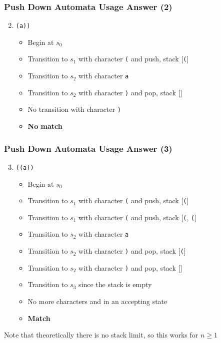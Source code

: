 \documentclass[aspectratio=169]{beamer}
\begin{document}
\begin{frame}
\frametitle{Push Down Automata Usage Answer (2)}

\pda{}

\begin{enumerate}
  \setcounter{enumi}{1}
  \item \lstinline{(a))}
    \begin{itemize}
      \item Begin at $s_0$
      \item Transition to $s_1$ with character \lstinline{(} and push, stack
        [\lstinline{(}]
      \item Transition to $s_2$ with character \lstinline{a}
      \item Transition to $s_2$ with character \lstinline{)} and pop, stack []
      \item No transition with character \lstinline{)}
      \item \textbf{No match}
    \end{itemize}
\end{enumerate}
\end{frame}

\begin{frame}
\frametitle{Push Down Automata Usage Answer (3)}

\pda{}

\begin{enumerate}
  \setcounter{enumi}{2}
  \item \lstinline{((a))}
    \begin{itemize}
      \item Begin at $s_0$
      \item Transition to $s_1$ with character \lstinline{(} and push, stack
        [\lstinline{(}]
      \item Transition to $s_1$ with character \lstinline{(} and push, stack
        [\lstinline{(}, \lstinline{(}]
      \item Transition to $s_2$ with character \lstinline{a}
      \item Transition to $s_2$ with character \lstinline{)} and pop, stack
        [\lstinline{(}]
      \item Transition to $s_2$ with character \lstinline{)} and pop, stack
        []
      \item Transition to $s_3$ since the stack is empty
      \item No more characters and in an accepting state
      \item \textbf{Match}
    \end{itemize}
\end{enumerate}

Note that theoretically there is no stack limit, so this works for $n \ge 1$
\end{frame}
\end{document}
